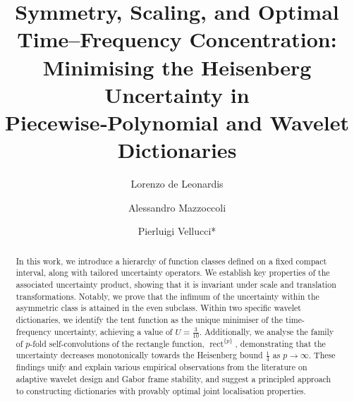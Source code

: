 \documentclass[preprint,hidelinks,authoryear]{elsarticle}
\theoremstyle{plain}
\theoremstyle{definition}
\theoremstyle{remark}
\begin{document}
\begin{frontmatter}



\title{Symmetry, Scaling, and Optimal Time–Frequency Concentration:
Minimising the Heisenberg Uncertainty in Piecewise‑Polynomial and Wavelet Dictionaries}

\author{Lorenzo de Leonardis}
\author{Alessandro Mazzoccoli}
\author{ Pierluigi Vellucci*}




\begin{abstract}
In this work, we introduce a hierarchy of function classes defined on a fixed compact interval, along with tailored uncertainty operators. We establish key properties of the associated uncertainty product, showing that it is invariant under scale and translation transformations. Notably, we prove that the infimum of the uncertainty within the asymmetric class is attained in the even subclass. Within two specific wavelet dictionaries, we identify the tent function as the unique minimiser of the time-frequency uncertainty, achieving a value of $U = \frac{3}{10}$. Additionally, we analyse the family of $p$-fold self-convolutions of the rectangle function, $\operatorname{rect}^{\{p\}}$, demonstrating that the uncertainty decreases monotonically towards the Heisenberg bound $ \frac{1}{4} $ as $p \to \infty$. These findings unify and explain various empirical observations from the literature on adaptive wavelet design and Gabor frame stability, and suggest a principled approach to constructing dictionaries with provably optimal joint localisation properties.
\end{abstract}


\end{frontmatter}
\end{document}
